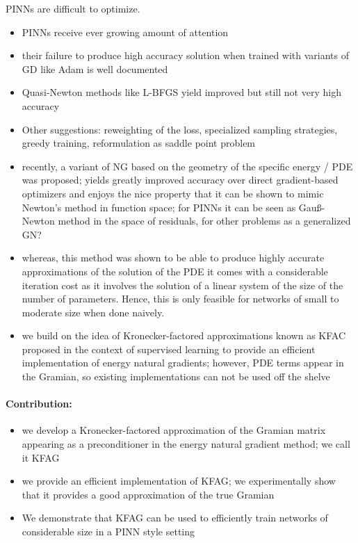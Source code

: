 PINNs are difficult to optimize.
\begin{itemize}
    \item PINNs receive ever growing amount of attention
    \item their failure to produce high accuracy solution when trained with variants of GD like Adam is well documented
    \item Quasi-Newton methods like L-BFGS yield improved but still not very high accuracy
    \item Other suggestions: reweighting of the loss, specialized sampling strategies, greedy training, reformulation as saddle point problem
    \item recently, a variant of NG based on the geometry of the specific energy / PDE was proposed; yields greatly improved accuracy over direct gradient-based optimizers and enjoys the nice property that it can be shown to mimic Newton's method in function space; for PINNs it can be seen as Gau\ss-Newton method in the space of residuals, for other problems as a generalized GN?
    \item whereas, this method was shown to be able to produce highly accurate approximations of the solution of the PDE it comes with a considerable iteration cost as it involves the solution of a linear system of the size of the number of parameters. Hence, this is only feasible for networks of small to moderate size when done naively.
    \item we build on the idea of Kronecker-factored approximations known as KFAC proposed in the context of supervised learning to provide an efficient implementation of energy natural gradients; 
    however, PDE terms appear in the Gramian, so existing implementations can not be used off the shelve 
\end{itemize}

\paragraph{Contribution:} 

\begin{itemize}
    \item we develop a Kronecker-factored approximation of the Gramian matrix appearing as a preconditioner in the energy natural gradient method; we call it KFAG 
    \item we provide an efficient implementation of KFAG; we experimentally show that it provides a good approximation of the true Gramian 
    \item We demonstrate that KFAG can be used to efficiently train networks of considerable size in a PINN style setting 
\end{itemize}

